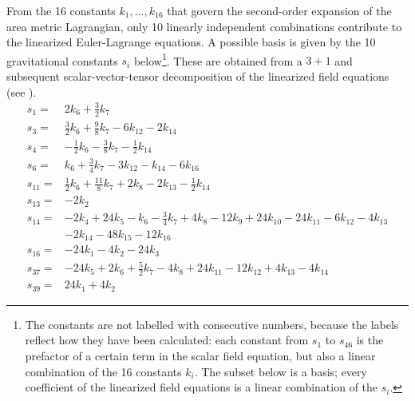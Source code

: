 From the 16 constants $k_{1},\dots,k_{16}$ that govern the second-order expansion of the area metric Lagrangian, only 10 linearly independent combinations contribute to the linearized Euler-Lagrange equations. A possible basis is given by the 10 gravitational constants $s_{i}$ below\footnote{The constants are not labelled with consecutive numbers, because the labels reflect how they have been calculated: each constant from $s_1$ to $s_{46}$ is the prefactor of a certain term in the scalar field equation, but also a linear combination of the 16 constants $k_{i}$. The subset below is a basis; every coefficient of the linearized field equations is a linear combination of the $s_{i}$.}. These are obtained from a $3+1$ and subsequent scalar-vector-tensor decomposition of the linearized field equations (see \cite{Alex_2020_area-metric-gravity}).
\begin{align}\label{eq_linearized_eom_constants}
    s_{1} = {} &  2 k_{6} + \frac{3}{2} k_{7} \nonumber \\
    s_{3} = {} &  \frac{3}{2} k_{6} + \frac{9}{8} k_{7} - 6 k_{12} - 2 k_{14} \nonumber \\
    s_{4} = {} &  -\frac{1}{2} k_{6} - \frac{3}{8} k_{7} - \frac{1}{2} k_{14} \nonumber \\
    s_{6} = {} &  k_{6} + \frac{3}{4} k_{7} - 3 k_{12} - k_{14} - 6 k_{16} \nonumber \\
    s_{11} = {} &  \frac{1}{2} k_{6} + \frac{11}{8} k_{7} + 2 k_{8} - 2 k_{13} - \frac{1}{2} k_{14} \nonumber \\
    s_{13} = {} &  -2 k_{2} \nonumber \\
    s_{14} = {} &  -2 k_{4} + 24 k_{5} - k_{6} - \frac{3}{4} k_{7} + 4 k_{8} - 12 k_{9} + 24 k_{10} - 24 k_{11} - 6 k_{12} - 4 k_{13} \nonumber \\ & - 2 k_{14} - 48 k_{15} - 12 k_{16} \nonumber \\
    s_{16} = {} &  -24 k_{1} - 4 k_{2} - 24 k_{3} \nonumber \\
    s_{37} = {} &  -24 k_{5} + 2 k_{6} + \frac{5}{2} k_{7} - 4 k_{8} + 24 k_{11} - 12 k_{12} + 4 k_{13} - 4 k_{14} \nonumber \\
    s_{39} = {} &  24 k_{1} + 4 k_{2}
\end{align}
